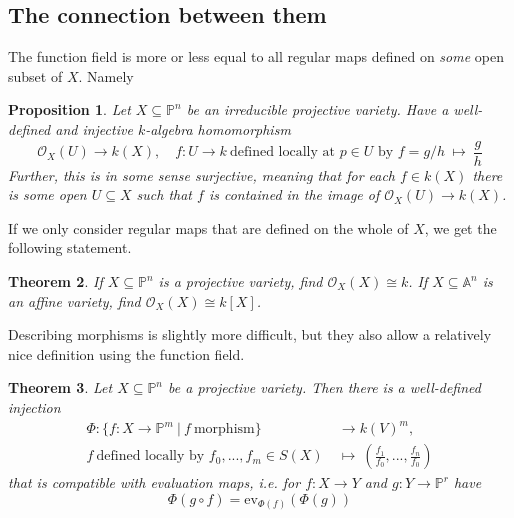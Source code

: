 \documentclass{scrartcl}
\newtheorem{prop}{Proposition}[section]
\newtheorem{theorem}[prop]{Theorem}
\theoremstyle{definition}
\begin{document}
\subsection{The connection between them}
The function field is more or less equal to all regular maps defined on \emph{some} open subset of $X$. Namely
\begin{prop}
    Let $X \subseteq \mathbb{P}^n$ be an irreducible projective variety.
    Have a well-defined and injective $k$-algebra homomorphism
    \begin{equation*}
        \mathcal{O}_X(U) \to k(X), \quad f: U \to k \ \text{defined locally at $p \in U$ by $f = g/h$} \ \mapsto \ \frac g h
    \end{equation*}
    Further, this is in some sense surjective, meaning that for each $f \in k(X)$ there is some open $U \subseteq X$ such that $f$ is contained in the image of $\mathcal{O}_X(U) \to k(X)$.
\end{prop}
If we only consider regular maps that are defined on the whole of $X$, we get the following statement.
\begin{theorem}
    If $X \subseteq \mathbb{P}^n$ is a projective variety, find $\mathcal{O}_X(X) \cong k$.
    If $X \subseteq \mathbb{A}^n$ is an affine variety, find $\mathcal{O}_X(X) \cong k[X]$.
\end{theorem}
Describing morphisms is slightly more difficult, but they also allow a relatively nice definition using the function field.
\begin{theorem}
    Let $X \subseteq \mathbb{P}^n$ be a projective variety.
    Then there is a well-defined injection
    \begin{align*}
        \Phi: \{ f: X \to \mathbb{P}^m \ | \ f \ \text{morphism} \} &\to k(V)^m, \\ 
        f \ \text{defined locally by $f_0, ..., f_m \in S(X)$} \ &\mapsto \ \left( \frac {f_1} {f_0}, ..., \frac {f_n} {f_0} \right)
    \end{align*}
    that is compatible with evaluation maps, i.e. for $f: X \to Y$ and $g: Y \to \mathbb{P}^r$ have
    \begin{equation*}
        \Phi(g \circ f) = \mathrm{ev}_{\Phi(f)}(\Phi(g))
    \end{equation*}
\end{theorem}
\end{document}
